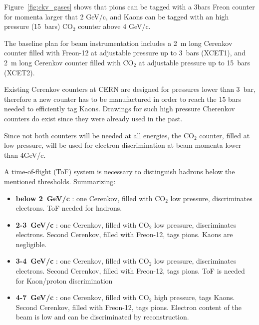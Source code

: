 Figure~\ref{fig:ckv_gases} shows that pions can be tagged with a 3bars Freon counter for momenta larger that 2 GeV/c, and Kaons can be tagged with an high pressure  (15~bars) CO$_2$  counter above 4 GeV/c.

The baseline plan for beam instrumentation includes a 2~m long
Cerenkov  counter filled with Freon-12 at adjustable pressure up to
3~bars (XCET1), and   2~m long  
 Cerenkov  counter filled with CO$_2$ at adjustable pressure up to
 15~bars (XCET2).

Existing Cerenkov counters at CERN are designed for pressures lower than  3~bar, therefore a new counter has to be manufactured in order to reach the 15 bars needed to efficiently tag Kaons. Drawings for such high pressure Cherenkov counters do exist since they were already used in the past.

Since not both  counters will be needed at all energies, the CO$_2$
counter, filled at low pressure,  will be used for electron discrimination at beam momenta lower
than 4GeV/c.  

A time-of-flight (ToF) system  is  necessary   to distinguish hadrons below the mentioned thresholds.
Summarizing:
\begin{itemize}
\item {\bf below 2~GeV/c} : one Cerenkov, filled with CO$_2$ low
  pressure, discriminates electrons. ToF needed for hadrons.
\item {\bf 2-3~GeV/c} : one Cerenkov, filled with CO$_2$ low
  pressure, discriminates electrons. Second Cerenkov, filled with
  Freon-12, tags pions. Kaons are negligible.
\item {\bf 3-4~GeV/c} : one Cerenkov, filled with CO$_2$ low
  pressure, discriminates electrons. Second  Cerenkov, filled with
  Freon-12, tags pions. ToF is needed for Kaon/proton discrimination
\item {\bf 4-7~GeV/c} : one Cerenkov, filled with CO$_2$ high
  pressure, tags Kaons. Second  Cerenkov, filled with
  Freon-12, tags pions. Electron content of the beam is low and can be
  discriminated by reconstruction.
\end{itemize}



